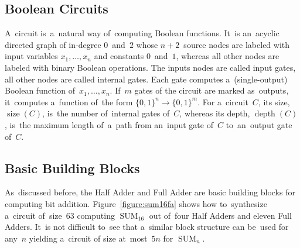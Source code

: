 \documentclass[a4paper, UKenglish, cleveref, autoref,  thm-restate]{lipics-v2021}
\DeclareMathOperator{\SUM}{SUM}
\begin{document}
    \subsection{Boolean Circuits}
    A~circuit is~a~natural way of~computing Boolean functions.
    It~is an~acyclic directed graph of in-degree $0$~and~$2$ whose $n+2$~source
    nodes are labeled with input variables
    $x_1, \dotsc, x_n$ and constants $0$~and~$1$, whereas all other nodes
    are labeled with binary Boolean operations.
    The inputs nodes are called input gates, all other nodes are called internal gates.
    Each gate computes
    a~(single-output) Boolean function of~$x_1, \dotsc, x_n$. If~$m$ gates of the
    circuit are marked as~outputs, it~computes a~function of~the form $\{0,1\}^n \to \{0,1\}^m$.
    For a~circuit~$C$, its size, $\operatorname{size}(C)$,
    is~the number of~internal gates of~$C$,
    whereas its depth, $\operatorname{depth}(C)$,
    is~the maximum length of~a~path
    from an~input gate of~$C$ to~an~output gate of~$C$.


    \subsection{Basic Building Blocks}
    As~discussed before, the Half Adder and Full Adder are basic building
    blocks for computing bit addition. Figure~\ref{figure:sum16fa}
    shows how to~synthesize a~circuit of~size~$63$ computing $\SUM_{16}$
    out of~four Half Adders and eleven Full Adders.
    It~is not difficult to~see that a~similar block structure can
    be~used for any~$n$ yielding a~circuit of size at~most~$5n$ for $\SUM_n$.
\end{document}

